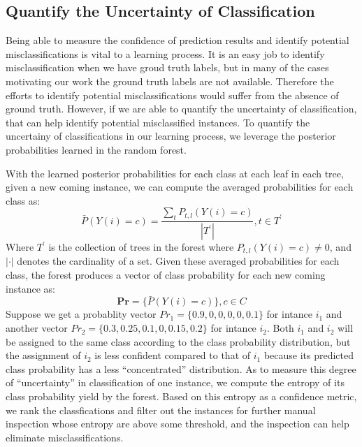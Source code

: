 
\subsection{Quantify the Uncertainty of Classification}
Being able to measure the confidence of prediction results and identify potential misclassifications is vital to a learning process. It is an easy job to 
identify misclassification when we have groud truth labels, but in many of the cases motivating our work the ground truth labels are not available. Therefore the 
efforts to identify potential misclassifications would suffer from the absence of ground truth. However, if we are able to quantify the uncertainty of classification, 
that can help identify potential misclassified instances. To quantify the uncertainy of classifications in our learning process, we leverage the posterior probabilities 
learned in the random forest.

With the learned posterior probabilities for each class at each leaf in each tree, given a new coming instance, we can compute the averaged probabilities for each class as:
\begin{displaymath}
    \bar P(Y(i)=c) = \frac{\sum_{t} P_{t,l}(Y(i)=c)}{|T^{'}|}, t\in T^{'}
\end{displaymath}
Where $T^{'}$ is the collection of trees in the forest where $P_{t,l}(Y(i)=c)\neq 0$, and $|\cdot|$ denotes the cardinality of a set. Given these averaged 
probabilities for each class, the forest produces a vector of class probability for each new coming instance as:
\begin{displaymath}
\textbf{Pr} = \{\bar P(Y(i)=c)\}, c\in C
\end{displaymath}
Suppose we get a probablity vector $Pr_{1} = \{0.9, 0, 0, 0, 0, 0.1\}$ for intance $i_{1}$ and another vector $Pr_{2} = \{0.3, 0.25, 0.1, 0, 0.15, 0.2\}$ for intance $i_{2}$.
Both $i_{1}$ and $i_{2}$ will be assigned to the same class according to the class probability distribution, but the assignment of $i_{2}$ is less confident compared to that 
of $i_{1}$ because its predicted class probability has a less ``concentrated'' distribution. As to measure this degree of ``uncertainty'' in classification of one instance, 
we compute the entropy of its class probability yield by the forest. Based on this entropy as a confidence metric, we rank the classfications and filter out the instances for 
further manual inspection whose entropy are above some threshold, and the inspection can help eliminate misclassifications.
